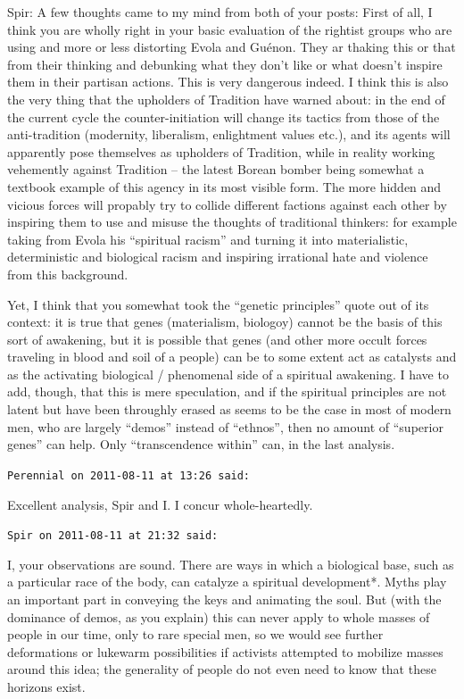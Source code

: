 \begin{footnotesize}
\begin{sffamily}
Spir: A few thoughts came to my mind from both of your posts: First of all, I think you are wholly right in your basic evaluation of the rightist groups who are using and more or less distorting Evola and Guénon. They ar thaking this or that from their thinking and debunking what they don't like or what doesn't inspire them in their partisan actions. This is very dangerous indeed. I think this is also the very thing that the upholders of Tradition have warned about: in the end of the current cycle the counter-initiation will change its tactics from those of the anti-tradition (modernity, liberalism, enlightment values etc.), and its agents will apparently pose themselves as upholders of Tradition, while in reality working vehemently against Tradition -- the latest Borean bomber being somewhat a textbook example of this agency in its most visible form. The more hidden and vicious forces will propably try to collide different factions against each other by inspiring them to use and misuse the thoughts of traditional thinkers: for example taking from Evola his ``spiritual racism'' and turning it into materialistic, deterministic and biological racism and inspiring irrational hate and violence from this background.

Yet, I think that you somewhat took the ``genetic principles'' quote out of its context: it is true that genes (materialism, biologoy) cannot be the basis of this sort of awakening, but it is possible that genes (and other more occult forces traveling in blood and soil of a people) can be to some extent act as catalysts and as the activating biological / phenomenal side of a spiritual awakening. I have to add, though, that this is mere speculation, and if the spiritual principles are not latent but have been throughly erased as seems to be the case in most of modern men, who are largely ``demos'' instead of ``ethnos'', then no amount of ``superior genes'' can help. Only ``transcendence within'' can, in the last analysis.

\hfill

\texttt{Perennial on 2011-08-11 at 13:26 said:}

Excellent analysis, Spir and I. I concur whole-heartedly.

\hfill

\texttt{Spir on 2011-08-11 at 21:32 said:}

I, your observations are sound. There are ways in which a biological base, such as a particular race of the body, can catalyze a spiritual development*. Myths play an important part in conveying the keys and animating the soul. But (with the dominance of demos, as you explain) this can never apply to whole masses of people in our time, only to rare special men, so we would see further deformations or lukewarm possibilities if activists attempted to mobilize masses around this idea; the generality of people do not even need to know that these horizons exist.


\end{sffamily}
\end{footnotesize}
